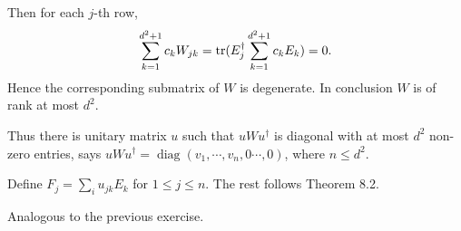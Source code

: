 Then for each $j$-th row,
$$\sum_{k=1}^{d^2+1}c_kW_{jk}=\operatorname{tr}(E_j^\dagger\sum_{k=1}^{d^2+1}c_kE_k)=0.$$
Hence the corresponding submatrix of $W$ is degenerate.
In conclusion $W$ is of rank at most $d^2$.

Thus there is unitary matrix $u$ such that $uWu^\dagger$ is diagonal with at most $d^2$ non-zero entries, says $uWu^\dagger=\operatorname{diag}(v_1,\cdots,v_n,0\cdots,0)$, where $n\le d^2$.

Define $F_j=\sum_iu_{jk}E_k$ for $1\le j\le n$.
The rest follows Theorem 8.2.

\ex Analogous to the previous exercise.
